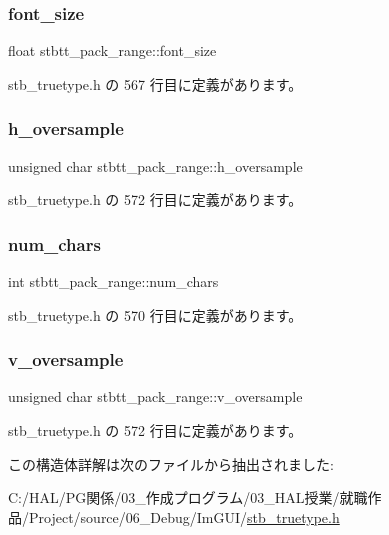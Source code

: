\subsubsection{\texorpdfstring{font\+\_\+size}{font\_size}}
{\footnotesize\ttfamily float stbtt\+\_\+pack\+\_\+range\+::font\+\_\+size}



 stb\+\_\+truetype.\+h の 567 行目に定義があります。

\mbox{\label{structstbtt__pack__range_a7a642139ce446c58fde5c48553bcf008}} 
\subsubsection{\texorpdfstring{h\+\_\+oversample}{h\_oversample}}
{\footnotesize\ttfamily unsigned char stbtt\+\_\+pack\+\_\+range\+::h\+\_\+oversample}



 stb\+\_\+truetype.\+h の 572 行目に定義があります。

\mbox{\label{structstbtt__pack__range_a046d65b6ffb65fb998d471ba098e2e23}} 
\subsubsection{\texorpdfstring{num\+\_\+chars}{num\_chars}}
{\footnotesize\ttfamily int stbtt\+\_\+pack\+\_\+range\+::num\+\_\+chars}



 stb\+\_\+truetype.\+h の 570 行目に定義があります。

\mbox{\label{structstbtt__pack__range_a6288f14006e257544db3d015c32b4113}} 
\subsubsection{\texorpdfstring{v\+\_\+oversample}{v\_oversample}}
{\footnotesize\ttfamily unsigned char stbtt\+\_\+pack\+\_\+range\+::v\+\_\+oversample}



 stb\+\_\+truetype.\+h の 572 行目に定義があります。



この構造体詳解は次のファイルから抽出されました\+:\begin{DoxyCompactItemize}
\item 
C\+:/\+H\+A\+L/\+P\+G関係/03\+\_\+作成プログラム/03\+\_\+\+H\+A\+L授業/就職作品/\+Project/source/06\+\_\+\+Debug/\+Im\+G\+U\+I/\mbox{\hyperlink{stb__truetype_8h}{stb\+\_\+truetype.\+h}}\end{DoxyCompactItemize}
